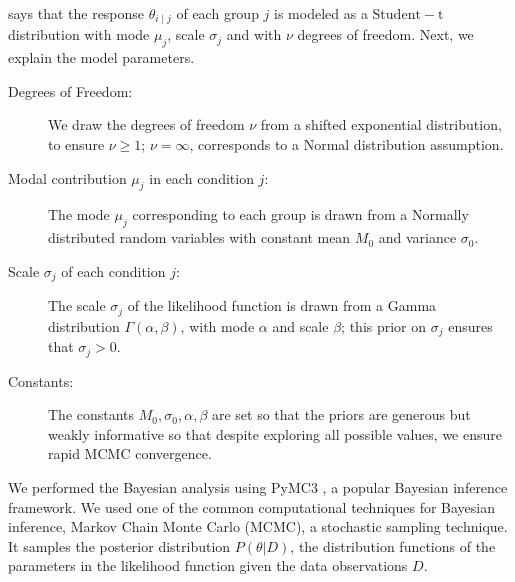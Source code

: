  says that the response $\theta_{i \mid j}$ of each group $j$ is modeled as a $\mathrm{Student-t}$ distribution with mode $\mu_j$,  scale $\sigma_j$ and with $\nu$ degrees of freedom. Next, we explain the model parameters.


\begin{description}
    \item[Degrees of Freedom:] We draw the degrees of freedom $\nu$ from a shifted exponential distribution, to ensure $\nu \geq 1$; $\nu=\infty$, corresponds to a Normal distribution assumption.
    \item[Modal contribution $\mu_j$ in each condition $j$:] The mode $\mu_j$ corresponding to each group is drawn from a Normally distributed random variables with constant mean $M_0$ and variance $\sigma_0$. 
    \item[Scale $\sigma_j$ of each condition $j$:]  The scale $\sigma_j$ of the likelihood function is drawn from a Gamma distribution $\Gamma(\alpha, \beta)$, with mode $\alpha$ and scale $\beta$; this prior on $\sigma_j$ ensures that $\sigma_j > 0$. 
    \item[Constants:] The constants $M_0, \sigma_0, \alpha, \beta$ are set so that the priors are generous but weakly informative so that despite exploring all possible values, we ensure rapid MCMC convergence.
\end{description}

We performed the Bayesian analysis using PyMC3 \cite{salvatier2016probabilistic}, 
a popular Bayesian inference framework. We used one of the common computational techniques for Bayesian inference, Markov Chain Monte Carlo (MCMC), a stochastic sampling technique. It samples the posterior distribution $P(\theta | D)$, the distribution functions of the parameters in the likelihood function given the data observations $D$. 




